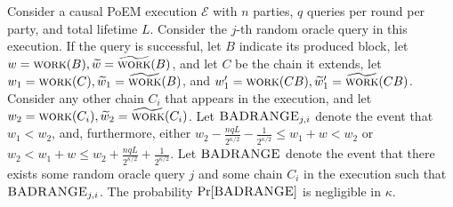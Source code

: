 \begin{lemma}\label{lem:good-ranges}
  Consider a causal PoEM execution $\mathcal{E}$ with $n$ parties, $q$ queries per round per party,
  and total lifetime $L$.
  Consider the $j$-th random oracle query in this execution.
  If the query is successful, let $B$ indicate its produced block, let
  $w = \textsc{work}(B), \widetilde{w} = \widetilde{\textsc{work}}(B)$, and let $C$ be the
  chain it extends, let $w_1 = \textsc{work}(C), \widetilde{w}_1 = \widetilde{\textsc{work}}(B)$, and
  $w_1' = \textsc{work}(CB), \widetilde{w}_1' = \widetilde{\textsc{work}}(CB)$. Consider any other chain $C_i$ that appears in the
  execution, and let $w_2 = \textsc{work}(C_i), \widetilde{w}_2 = \widetilde{\textsc{work}}(C_i)$.
  Let $\textsc{BADRANGE}_{j,i}$ denote the event that
  $w_1 < w_2$, and, furthermore, either
  $w_2 - \frac{nqL}{2^{\kappa/2}} - \frac{1}{2^{\kappa/2}} \leq w_1 + w < w_2$ or
  $w_2 < w_1 + w \leq w_2 + \frac{nqL}{2^{\kappa/2}} + \frac{1}{2^{\kappa/2}}$.
  Let $\textsc{BADRANGE}$ denote the event that there exists some random oracle query $j$
  and some chain $C_i$ in the execution such that $\textsc{BADRANGE}_{j,i}$.
  The probability $\Pr[\textsc{BADRANGE}]$ is negligible in $\kappa$.
\end{lemma}
